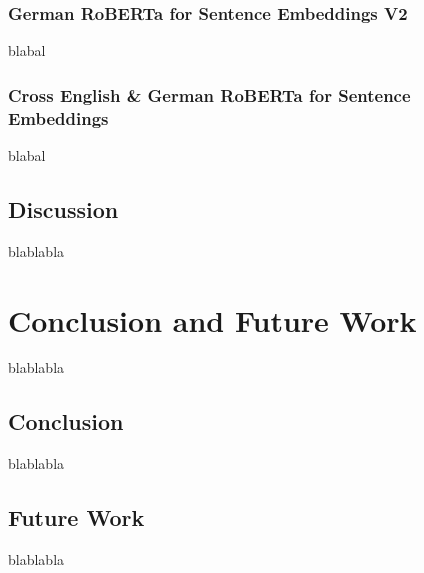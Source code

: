 \documentclass[fontsize=12pt,a4paper,twoside,openany]{scrbook}
\begin{document}
\subsection{German RoBERTa for Sentence Embeddings V2}
\label{sec:roberta_de_result}
blabal

\subsection{Cross English \& German RoBERTa for Sentence Embeddings}
\label{sec:roberta_de_en_result}
blabal

\section{Discussion}
\label{sec:discussion}
blablabla


\chapter{Conclusion and Future Work}
blablabla

\section{Conclusion}
blablabla

\section{Future Work}
blablabla


\newpage



\printbibliography[heading=bibintoc]


\newpage

\listoffigures
\newpage

\listoftables
\newpage



\end{document}
